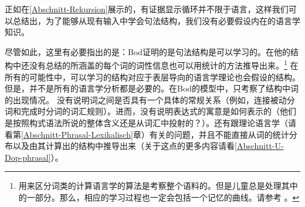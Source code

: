 正如在\ref{Abschnitt-Rekursion}展示的，有证据显示循环并不限于语言，这样我们可以总结出，为了能够从现有输入中学会句法结构，我们没有必要假设内在的语言学知识。

尽管如此，这里有必要指出的是：Bod证明的是句法结构是可以学习的。在他的结构中还没有总结的所涵盖的每个词的词性信息也可以用统计的方法推导出来\citep{RCF98a,Clark2000a}。\footnote{%
用来区分词类的计算语言学的算法是考察整个语料的。但是儿童总是处理其中的一部分。那么，相应的学习过程也一定会包括一个记忆的曲线。请参考 。
}
在所有的可能性中，可以学习的结构对应于表层导向的语言学理论也会假设的结构。但是，并不是所有的语言学分析都是必要的。在Bod的模型中，只考察了结构中词的出现情况。
没有说明词之间是否具有一个具体的常规关系（例如，连接被动分词和完成时分词的词汇规则）。进而，没有说明表达式的寓意是如何表示的（他们是按照构式语法所说的整体含义还是从词汇中投射的？）。还有跟理论语言学（请看第\ref{Abschnitt-Phrasal-Lexikalisch}章）有关的问题，并且不能直接从词的统计分布以及由其计算出的结构中推导出来（关于这点的更多内容请看\ref{Abschnitt-U-Dop-phrasal}）。

